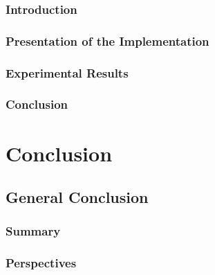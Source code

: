 \documentclass[english]{spimutbmphdthesis}
\begin{document}
\section{Introduction}

\section{Presentation of the Implementation}

\section{Experimental Results}

\section{Conclusion}

\part{Conclusion}

\chapter{General Conclusion}

\section{Summary}

\section{Perspectives}

\backmatter






\end{document}
